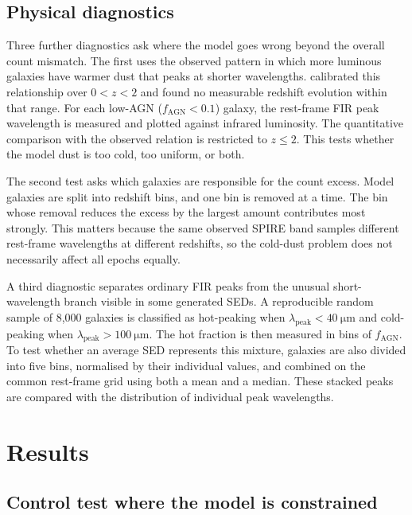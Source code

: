 \documentclass[12pt,a4paper]{article}
\begin{document}
\subsection{Physical diagnostics}
\label{sec:methods:diagnostics}
Three further diagnostics ask where the model goes wrong beyond the overall count
mismatch. The first uses the observed pattern in which more luminous galaxies have
warmer dust that peaks at shorter wavelengths. \citet{Drew_2022} calibrated this
relationship over $0<z<2$ and found no measurable redshift evolution within that range.
For each low-AGN ($f_\mathrm{AGN}<0.1$) \popcosmos{} galaxy, the rest-frame FIR peak
wavelength is measured and plotted against infrared luminosity. The quantitative
comparison with the observed relation is restricted to $z\leq2$. This tests whether the
model dust is too cold, too uniform, or both.

The second test asks which galaxies are responsible for the count excess. Model galaxies
are split into redshift bins, and one bin is removed at a time. The bin whose removal
reduces the excess by the largest amount contributes most strongly. This matters because
the same observed SPIRE band samples different rest-frame wavelengths at different
redshifts, so the cold-dust problem does not necessarily affect all epochs equally.

A third diagnostic separates ordinary FIR peaks from the unusual short-wavelength
branch visible in some generated SEDs. A reproducible random sample of 8,000 galaxies
is classified as hot-peaking when $\lambda_\mathrm{peak}<\SI{40}{\um}$ and cold-peaking
when $\lambda_\mathrm{peak}>\SI{100}{\um}$. The hot fraction is then measured in bins
of $f_\mathrm{AGN}$. To test whether an average SED represents this mixture, galaxies
are also divided into five \LIR{} bins, normalised by their individual \LIR{} values,
and combined on the common rest-frame grid using both a mean and a median. These stacked
peaks are compared with the distribution of individual peak wavelengths.

\section{Results}
\label{sec:results}

\subsection{Control test where the model is constrained}
\label{sec:results:control}
\end{document}
